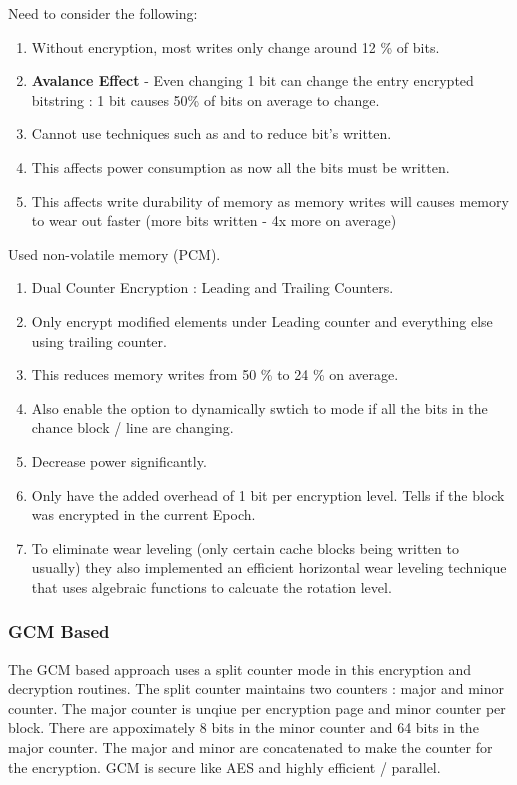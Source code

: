 Need to consider the following:
\begin{enumerate}
  \item Without encryption, most writes only change around 12 \% of bits.
  \item \textbf{Avalance Effect} \cite{avalance} - Even changing 1 bit can
    change the entry encrypted bitstring : 1 bit causes 50\% of bits on average
    to change.
  \item Cannot use techniques such as  \cite{dcr} and
     \cite{fnw} to reduce bit's written.
  \item This affects power consumption as now all the bits must be written.
  \item This affects write durability of memory as memory writes will causes
    memory to wear out faster (more bits written - 4x more on average)
\end{enumerate}
Used non-volatile memory (PCM).
\begin{enumerate}
  \item Dual Counter Encryption : Leading and Trailing Counters.
  \item Only encrypt modified elements under Leading counter and everything
    else using trailing counter.
  \item This reduces memory writes from 50 \% to 24 \% on average.
  \item Also enable the option to dynamically swtich to  mode
    if all the bits in the chance block / line are changing.
  \item Decrease power significantly.
  \item Only have the added overhead of 1 bit per encryption level. Tells if
    the block was encrypted in the current Epoch.
  \item To eliminate wear leveling (only certain cache blocks being written to
    usually) they also implemented an efficient horizontal wear leveling
    technique that uses algebraic functions to calcuate the rotation level.
\end{enumerate}

\subsubsection{GCM Based}
The GCM based approach \cite{gcmMem} uses a split counter mode in this
encryption and decryption routines. The split counter maintains two counters :
major and minor counter. The major counter is unqiue per encryption page and
minor counter per block. There are appoximately 8 bits in the minor counter and
64 bits in the major counter. The major and minor are concatenated to make the
counter for the encryption. GCM is secure like AES and highly efficient /
parallel.

